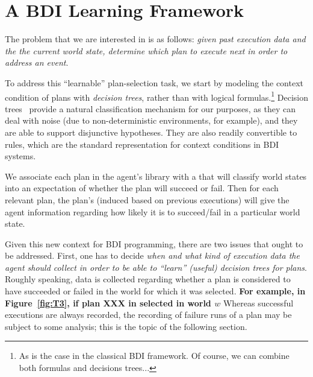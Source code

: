 \section{A BDI Learning Framework}\label{sec:framework}


The problem that we are interested in is as follows: \emph{given past execution
data and the the current world state, determine which plan to execute next 
in order to address an event}.


To address this ``learnable'' plan-selection task, we start by modeling the
context condition of plans with \emph{decision trees}, rather than with logical
formulas.\footnote{As is the case in the classical BDI framework. Of course, we can combine both formulas and decisions
trees...}
Decision trees~\cite{Mitchell97:ML}  provide a natural classification mechanism
for our purposes, as they can deal with noise (due to non-deterministic
environments, for example), and they are able to support disjunctive hypotheses.
They are also readily convertible to rules, which are the standard representation
for context conditions in BDI systems.




We associate each plan in the agent's library with a \dt
that will classify world states into an expectation of whether the plan will
succeed or fail. Then for each relevant plan, the plan's \dt (induced based on previous executions) will give the agent information regarding how likely it is to succeed/fail in a particular world state.


Given this new context for BDI programming, there are two issues that ought to be
addressed.
First, one has to decide \emph{when and what kind of execution data the agent should
collect in order to be able to ``learn'' (useful) decision trees for plans}.
Roughly speaking, data is collected regarding whether a plan is considered to
have succeeded or failed in the world for which it was selected.
\textbf{For example, in Figure~\ref{fig:T3}, if plan XXX in selected in world
$w$} %
Whereas successful executions are always recorded, the recording of failure runs
of a plan may be subject to some analysis; this is the topic of the following section.



